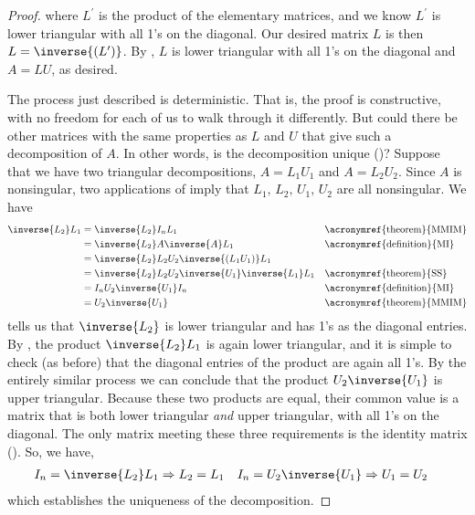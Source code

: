 \begin{proof}
%
where $L^\prime$ is the product of the elementary matrices, and we know $L^\prime$ is lower triangular with all 1's on the diagonal.  Our desired matrix $L$ is then $L=\inverse{\left(L^\prime\right)}$.  By , $L$ is lower triangular with all 1's on the diagonal and $A=LU$, as desired.\par
%
The process just described is deterministic.  That is, the proof is constructive, with no freedom for each of us to walk through it differently.  But could there be other matrices with the same properties as $L$ and $U$ that give such a decomposition of $A$.  In other words, is the decomposition unique ()?  Suppose that we have two triangular decompositions, $A=L_1U_1$ and $A=L_2U_2$.  Since $A$ is nonsingular, two applications of  imply that $L_1,\,L_2,\,U_1,\,U_2$ are all nonsingular.  We have
%
\begin{align*}
\inverse{L_2}L_1
&=\inverse{L_2}I_nL_1&&\text{\acronymref{theorem}{MMIM}}\\
&=\inverse{L_2}A\inverse{A}L_1&&\text{\acronymref{definition}{MI}}\\
&=\inverse{L_2}L_2U_2\inverse{\left(L_1U_1\right)}L_1\\
&=\inverse{L_2}L_2U_2\inverse{U_1}\inverse{L_1}L_1&&\text{\acronymref{theorem}{SS}}\\
&=I_nU_2\inverse{U_1}I_n&&\text{\acronymref{definition}{MI}}\\
&=U_2\inverse{U_1}&&\text{\acronymref{theorem}{MMIM}}
\end{align*}
%
 tells us that $\inverse{L_2}$ is lower triangular and has 1's as the diagonal entries.  By , the product $\inverse{L_2}L_1$ is again lower triangular, and it is simple to check (as before) that the diagonal entries of the product are again all 1's.  By the entirely similar process we can conclude that the product $U_2\inverse{U_1}$ is upper triangular.  Because these two products are equal, their common value is a matrix that is both lower triangular {\em and} upper triangular, with all 1's on the diagonal.  The only matrix meeting these three requirements is the identity matrix ().  So, we have,
%
\begin{align*}
I_n=\inverse{L_2}L_1&\Rightarrow
L_2=L_1
&
I_n=U_2\inverse{U_1}&\Rightarrow
U_1=U_2
\end{align*}
%
which establishes the uniqueness of the decomposition.
%
\end{proof}
